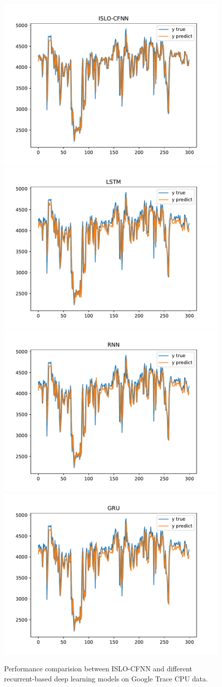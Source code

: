 \documentclass[a4paper,13pt,2p]{report}
\begin{document}
\begin{figure}[!ht] 
   \centering
   	\includegraphics[width=0.49\linewidth]{pdf/result_data/cpu/ISLO_CFNN_cpu}
  	 \includegraphics[width=0.49\linewidth]{pdf/result_data/cpu/LSTM_cpu}
  	 \includegraphics[width=0.49\linewidth]{pdf/result_data/cpu/RNN_cpu}
  	 \includegraphics[width=0.49\linewidth]{pdf/result_data/cpu/GRU_cpu}
	
  \caption{Performance comparision between ISLO-CFNN and different recurrent-based deep learning models on Google Trace CPU data.} 
  \label{fig_result_cpu_islo_rnn} 
\end{figure}
\end{document}
